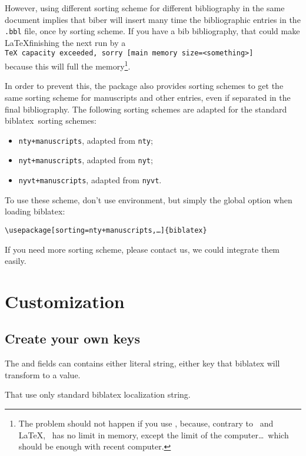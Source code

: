 \documentclass{ltxdockit}[2011/03/25]
\newcommand{\biblatex}{biblatex\xspace}
\begin{document}
However, using different sorting scheme for different bibliography in the same document implies that biber will insert many time the bibliographic entries in the \verb+.bbl+ file, once by sorting scheme.
If you have a bib bibliography, that could make \LaTeX finishing the next run by a\\ \verb`TeX capacity exceeded, sorry [main memory size=<something>]`
\\
because this will full the memory\footnote{The problem should not happen if you use \LuaLaTeX, because, contrary to \XeLaTeX\ and \LaTeX, \LuaLaTeX\ has no limit in memory, except the limit of the computer\ldots\ which should be enough with recent computer.}.

In order to prevent this, the package also provides sorting schemes to get the same sorting scheme for manuscripts and other entries, even if separated in the final bibliography.
The following sorting schemes are adapted for the standard \biblatex\ sorting schemes:
\begin{itemize}
  \item \verb`nty+manuscripts`, adapted from \verb+nty+; 
  \item \verb-nyt+manuscripts-, adapted from \verb-nyt-;
  \item \verb-nyvt+manuscripts-, adapted from \verb-nyvt-.
\end{itemize}

To use these scheme, don't use  environment, but simply the global option when loading \biblatex:
\begin{verbatim}
\usepackage[sorting=nty+manuscripts,…]{biblatex}
\end{verbatim}

If you need more sorting scheme, please contact us, we could integrate them easily.
 
\section{Customization}

\subsection{Create your own keys}\label{key-definition}

The  and  fields can contains either literal string, either key that \biblatex will transform to a value.

That use only standard \biblatex  localization string.
 
\end{document}
